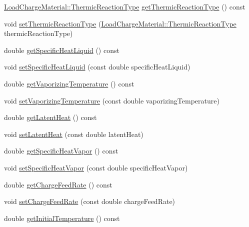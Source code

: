 \begin{DoxyCompactItemize}
\item 
\hyperlink{namespace_load_charge_material_a51d4263e865a5d86236622dd3fe23fd1}{Load\+Charge\+Material\+::\+Thermic\+Reaction\+Type} \hyperlink{class_liquid_load_charge_material_a181337f5e5cf6a47b82dd56897b49c29}{get\+Thermic\+Reaction\+Type} () const
\item 
void \hyperlink{class_liquid_load_charge_material_a39c258d0bfdcfa352590d411a8c4e882}{set\+Thermic\+Reaction\+Type} (\hyperlink{namespace_load_charge_material_a51d4263e865a5d86236622dd3fe23fd1}{Load\+Charge\+Material\+::\+Thermic\+Reaction\+Type} thermic\+Reaction\+Type)
\item 
double \hyperlink{class_liquid_load_charge_material_aa698f1f73dff91951139a4a50582963d}{get\+Specific\+Heat\+Liquid} () const
\item 
void \hyperlink{class_liquid_load_charge_material_a2187c4c6ba394c05ab42e769bf175683}{set\+Specific\+Heat\+Liquid} (const double specific\+Heat\+Liquid)
\item 
double \hyperlink{class_liquid_load_charge_material_a07004e345fb4ff287d435d0c84027973}{get\+Vaporizing\+Temperature} () const
\item 
void \hyperlink{class_liquid_load_charge_material_a50938e3270de5d3c59b872f290a761cc}{set\+Vaporizing\+Temperature} (const double vaporizing\+Temperature)
\item 
double \hyperlink{class_liquid_load_charge_material_aca3a38eb3343144042e9349b053da1bc}{get\+Latent\+Heat} () const
\item 
void \hyperlink{class_liquid_load_charge_material_a01d2d23580f27aa9e5cba1124635a677}{set\+Latent\+Heat} (const double latent\+Heat)
\item 
double \hyperlink{class_liquid_load_charge_material_ac4538f9722bf25465ec86586469a7b1e}{get\+Specific\+Heat\+Vapor} () const
\item 
void \hyperlink{class_liquid_load_charge_material_ae95faf01cf6293ab282b1b7fe3b849e1}{set\+Specific\+Heat\+Vapor} (const double specific\+Heat\+Vapor)
\item 
double \hyperlink{class_liquid_load_charge_material_af818c541527b3b28a8f84a08dc0c884e}{get\+Charge\+Feed\+Rate} () const
\item 
void \hyperlink{class_liquid_load_charge_material_a23d6aa6f15a124ddb1504261347b0b82}{set\+Charge\+Feed\+Rate} (const double charge\+Feed\+Rate)
\item 
double \hyperlink{class_liquid_load_charge_material_ab80229a78f884fb07e756665a616d401}{get\+Initial\+Temperature} () const
\item 

\end{DoxyCompactItemize}
